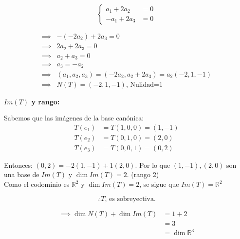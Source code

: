 \documentclass{article}
\begin{document}
\begin{enumerate}
			\begin{equation*}
				\begin{cases}
					a_1+2a_2 &=0 \\
					-a_1+2a_3 &=0
				\end{cases}
			\end{equation*}
			
			\begin{equation*}
				\begin{aligned}
					\implies& -(-2a_2)+2a_3 =0 \\
					\implies&2a_2+2a_3     =0 \\
					\implies& a_2+a_3       =0 \\
					\implies& a_3           =-a_2\\
					\implies& (a_1,a_2,a_3) =(-2a_2,a_2+2a_3) 
										   =a_2(-2,1,-1) \\
					\implies& N(T)=(-2,1,-1) \text{, Nulidad=1}
				\end{aligned}
			\end{equation*}
			
			\textbf{\(Im(T)\) y rango:}
			
			Sabemos que las imágenes de la base canónica: \\
			\begin{equation*}
				\begin{aligned}
					T(e_1) &=T(1,0,0) 
						    =(1,-1) \\
					T(e_2) &=T(0,1,0) 
						    =(2,0) \\
					T(e_3) &=T(0,0,1) 
						    =(0,2)
				\end{aligned}
			\end{equation*}
			
			Entonces: \((0,2) = -2(1,-1) + 1(2,0)\). Por lo que \((1,-1),(2,0)\) son una base de \(Im(T)\) y \(\dim Im(T)=2\). (rango 2)\\
			Como el codominio es \(\mathbb{R}^2\) y \(\dim Im(T)=2\), se sigue que \(Im(T)=\mathbb{R}^2\)
			
			\[
			\boxed{\therefore T \text{, es sobreyectiva.}} 
			\]
			
			\begin{equation*}
				\begin{aligned}
					\implies \dim N(T) + \dim Im (T) &=1+2 \\
													 &= 3 \\
												 	 &=\dim \mathbb{R}^3
				\end{aligned}
			\end{equation*}
			

\end{enumerate}
\end{document}
